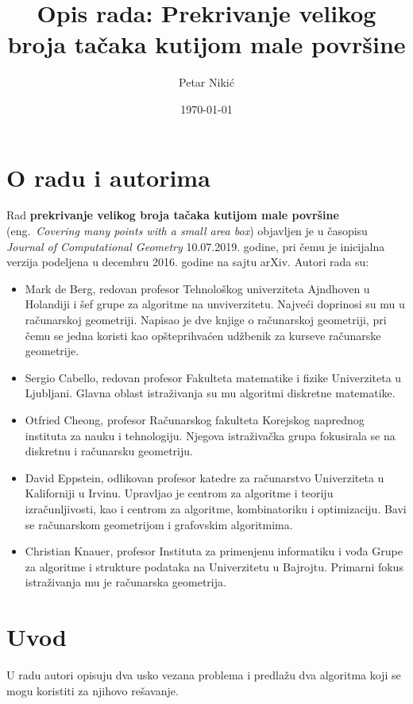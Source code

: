 \documentclass{article}
\title{Opis rada: Prekrivanje velikog broja tačaka kutijom male površine}
\author{Petar Nikić}
\date{\today}
\begin{document}
\maketitle

\section{O radu i autorima}

Rad \textbf{prekrivanje velikog broja tačaka kutijom male površine} (eng.~{\em Covering many points with a small area box})
objavljen je u časopisu {\em Journal of Computational Geometry} 10.07.2019. godine, pri čemu je inicijalna verzija podeljena
u decembru 2016. godine na sajtu arXiv. Autori rada su:

\begin{itemize}
	\item Mark de Berg, redovan profesor Tehnološkog univerziteta Ajndhoven u Holandiji i šef grupe za algoritme na unviverzitetu.
	Najveći doprinosi su mu u računarskoj geometriji. Napisao je dve knjige o računarskoj geometriji, pri čemu se jedna koristi kao
	opšteprihvaćen udžbenik za kurseve računarske geometrije.
	\item Sergio Cabello, redovan profesor Fakulteta matematike i fizike Univerziteta u Ljubljani. Glavna oblast istraživanja su
	mu algoritmi diskretne matematike.
	\item Otfried Cheong, profesor Računarskog fakulteta Korejskog naprednog instituta za nauku i tehnologiju. Njegova istraživačka
	grupa fokusirala se na diskretnu i računarsku geometriju.
	\item David Eppstein, odlikovan profesor katedre za računarstvo Univerziteta u Kaliforniji u Irvinu. Upravljao je centrom
	za algoritme i teoriju izračunljivosti, kao i centrom za algoritme, kombinatoriku i optimizaciju. Bavi se računarskom geometrijom
	i grafovskim algoritmima.
	\item Christian Knauer, profesor Instituta za primenjenu informatiku i vođa Grupe za algoritme i strukture podataka na Univerzitetu
	u Bajrojtu. Primarni fokus istraživanja mu je računarska geometrija.
\end{itemize}

\section{Uvod}

U radu autori opisuju dva usko vezana problema i predlažu dva algoritma koji se mogu koristiti za njihovo rešavanje.
\end{document}
